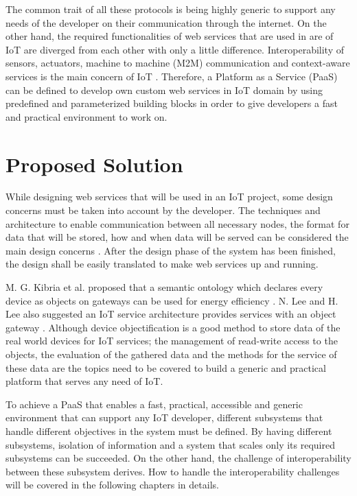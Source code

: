 The common trait of all these protocols is being highly generic to support any needs of the developer on their communication through the internet. On the other hand, the required functionalities of web services that are used in are of IoT are diverged from each other with only a little difference. Interoperability of sensors, actuators, machine to machine (M2M) communication and context-aware services is the main concern of IoT \cite{6651222}. Therefore, a Platform as a Service (PaaS) can be defined to develop own custom web services in IoT domain by using predefined and parameterized building blocks in order to give developers a fast and practical environment to work on.

\section{Proposed Solution}



While designing web services that will be used in an IoT project, some design concerns must be taken into account by the developer. The techniques and architecture to enable communication between all necessary nodes, the format for data that will be stored, how and when data will be served can be considered the main design concerns \cite{6651222}. After the design phase of the system has been finished, the design shall be easily translated to make web services up and running. 

M. G. Kibria et al. proposed that a semantic ontology which declares every device as objects on gateways can be used for energy efficiency \cite{7993747}. N. Lee and H. Lee also suggested an IoT service architecture provides services with an object gateway \cite{6884496}. Although device objectification is a good method to store data of the real world devices for IoT services; the management of read-write access to the objects, the evaluation of the gathered data and the methods for the service of these data are the topics need to be covered to build a generic and practical platform that serves any need of IoT. 


To achieve a PaaS that enables a fast, practical, accessible and generic environment that can support any IoT developer, different subsystems that handle different objectives in the system must be defined. By having different subsystems,  isolation of information and a system that scales only its required subsystems can be succeeded. On the other hand, the challenge of interoperability between these subsystem derives. How to handle the interoperability challenges will be covered in the following chapters in details.

